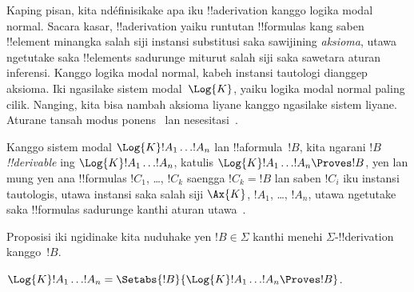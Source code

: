 \documentclass[../../../include/open-logic-section]{subfiles}
\begin{document}


Kaping pisan, kita ndéfinisikake apa iku !!a{derivation}
kanggo logika modal normal. Sacara kasar, !!a{derivation} yaiku
runtutan !!{formula}s kang saben !!{element} minangka salah siji
instansi substitusi saka sawijining \emph{aksioma}, utawa ngetutake
saka !!{element}s sadurunge miturut salah siji saka sawetara aturan
inferensi. Kanggo logika modal normal, kabeh instansi tautologi
dianggep aksioma. Iki ngasilake sistem modal~$\Log{K}$, yaiku logika
modal normal paling cilik. Nanging, kita bisa nambah aksioma liyane
kanggo ngasilake sistem liyane. Aturane tansah modus ponens~\MP{}
lan nesesitasi~\Nec.

\begin{defn}
  Kanggo sistem modal $\Log{K} !A_1 \dots !A_n$ lan !!a{formula}~$!B$,
  kita ngarani $!B$ \emph{!!{derivable}} ing $\Log{K} !A_1 \dots
  !A_n$, katulis $\Log{K} !A_1 \dots !A_n \Proves !B$, yen lan mung
  yen ana !!{formula}s $!C_1$, \dots, $!C_k$ saengga $!C_k = !B$
  lan saben $!C_i$ iku instansi tautologis, utawa instansi saka salah
  siji $\Ax{K}$, $!A_1$,
  \dots, $!A_n$, utawa ngetutake saka !!{formula}s sadurunge
  kanthi aturan \MP{} utawa~\Nec.
\end{defn}

Proposisi iki ngidinake kita nuduhake yen $!B \in \Sigma$
kanthi menehi $\Sigma$-!!{derivation} kanggo~$!B$.

\begin{prop}
  $\Log{K} !A_1 \dots !A_n = \Setabs{!B}{\Log{K} !A_1 \dots !A_n \Proves !B}$.
\end{prop}
\end{document}
